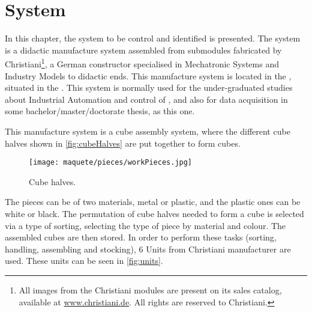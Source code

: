 
\chapter{System}
\label{chap:system}
In this chapter, the system to be control and identified is presented.
The system is a didactic manufacture system assembled from submodules fabricated
by Christiani\footnote{All images from the Christiani modules are present on its sales
  catalog, available at \url{www.christiani.de}. All rights are reserved to Christiani.}, a German
constructor specialised in Mechatronic Systems and Industry Models to
didactic ends.
This manufacture system is located in the \LCA, situated in the \UFRJ. This
system is normally used for the under-graduated studies about Industrial
Automation and control of \DESs, and also for data acquisition in some
bachelor\slash master\slash doctorate thesis, as this one.

This manufacture system is a cube assembly system, where the different cube
halves shown in \autoref{fig:cubeHalves} are put together to form cubes.
\begin{figure}[H]
  \centering
  \texttt{[image: maquete/pieces/workPieces.jpg]}
  \caption{Cube halves.}
  \label{fig:cubeHalves}
\end{figure}

The pieces can be of two materials, metal or plastic, and the plastic ones can
be white or black.
The
permutation of cube halves needed to form a cube is selected via a type of
sorting, selecting the type of piece by material and colour. The assembled cubes
are then stored. In order to perform these tasks (sorting, handling, assembling
and stocking), 6 Units from Christiani manufacturer are used. These units can be
seen in \autoref{fig:units}.

